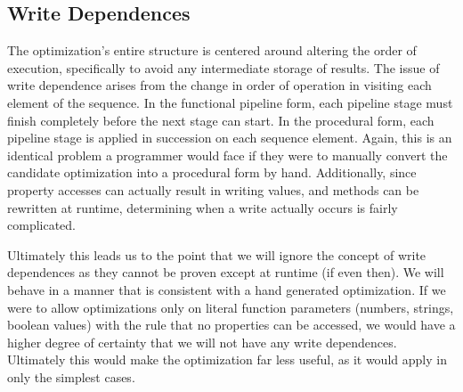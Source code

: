 \subsection{Write Dependences}

The optimization's entire structure is centered around altering the order of execution, specifically to avoid any intermediate storage of results. The issue of write dependence arises from the change in order of operation in visiting each element of the sequence.  In the functional pipeline form, each pipeline stage must finish completely before the next stage can start.  In the procedural form, each pipeline stage is applied in succession on each sequence element.  Again, this is an identical problem a programmer would face if they were to manually convert the candidate optimization into a procedural form by hand.  Additionally, since property accesses can actually result in writing values, and methods can be rewritten at runtime, determining when a write actually occurs is fairly complicated. 

Ultimately this leads us to the point that we will ignore the concept of write dependences as they cannot be proven except at runtime (if even then).  We will behave in a manner that is consistent with a hand generated optimization.  If we were to allow optimizations only on literal function parameters (numbers, strings, boolean values) with the rule that no properties can be accessed, we would have a higher degree of certainty that we will not have any write dependences.  Ultimately this would make the optimization far less useful, as it would apply in only the simplest cases.  